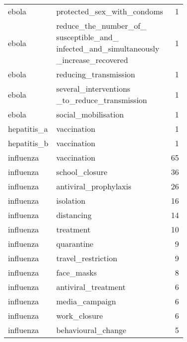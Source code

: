 \documentclass[
]{article}
\begin{document}
\begin{longtable}{llr}
ebola & protected\_sex\_with\_condoms & 1\\
 
	ebola & 
	\makecell[l]{
		reduce\_the\_number\_of\_\\
		susceptible\_and\_\\
		infected\_and\_simultaneously\\
		\_increase\_recovered
	} & 1\\
 
ebola & reducing\_transmission & 1\\
 
ebola &
\makecell[l]{several\_interventions\\
	\_to\_reduce\_transmission
	} & 1\\
 
ebola & social\_mobilisation & 1\\
 
hepatitis\_a & vaccination & 1\\
 
hepatitis\_b & vaccination & 1\\
 
influenza & vaccination & 65\\
 
influenza & school\_closure & 36\\
 
influenza & antiviral\_prophylaxis & 26\\
 
influenza & isolation & 16\\
 
influenza & distancing & 14\\
 
influenza & treatment & 10\\
 
influenza & quarantine & 9\\
 
influenza & travel\_restriction & 9\\
 
influenza & face\_masks & 8\\
 
influenza & antiviral\_treatment & 6\\
 
influenza & media\_campaign & 6\\
 
influenza & work\_closure & 6\\
 
influenza & behavioural\_change & 5\\
 

\end{longtable}
\end{document}
